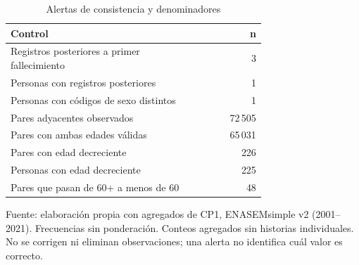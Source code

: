 \begin{table}[!htbp]
\centering
\caption{Alertas de consistencia y denominadores}\label{tab:cp1-anomalias}
\small\setlength{\tabcolsep}{4pt}
\renewcommand{\arraystretch}{1.15}
\begin{tabular}{p{0.72\linewidth}r}
\toprule
\textbf{Control} & \textbf{n} \\
\midrule
Registros posteriores a primer fallecimiento & 3 \\
Personas con registros posteriores & 1 \\
Personas con códigos de sexo distintos & 1 \\
Pares adyacentes observados & 72\,505 \\
Pares con ambas edades válidas & 65\,031 \\
Pares con edad decreciente & 226 \\
Personas con edad decreciente & 225 \\
Pares que pasan de 60+ a menos de 60 & 48 \\
\bottomrule
\end{tabular}
\par\medskip
\parbox{\linewidth}{\footnotesize Fuente: elaboración propia con agregados de CP1, ENASEMsimple v2 (2001--2021). Frecuencias sin ponderación. Conteos agregados sin historias individuales. No se corrigen ni eliminan observaciones; una alerta no identifica cuál valor es correcto.}
\end{table}
